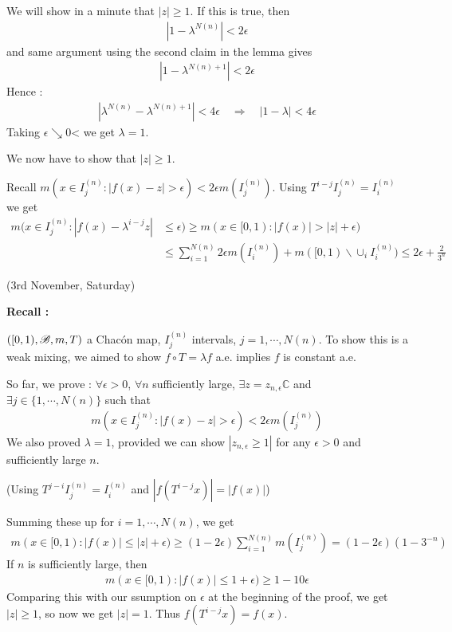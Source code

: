 \documentclass[12pt,a4paper]{report}
\newenvironment{proof}
{\begin{changemargin}{1cm}{0.5cm} 
	}%
	{\end{changemargin}
}
\newenvironment{subproof}
{\begin{changemargin}{0.5cm}{0.5cm}
	}%
	{\end{changemargin}
}
\begin{document}
\begin{proof}
\quad We will show in a minute that $|z| \geq 1$. If this is true, then
\begin{align*}
|1-\lambda^{N(n)}| < 2\epsilon
\end{align*} 
and same argument using the second claim in the lemma gives
\begin{align*}
|1- \lambda^{N(n)+1}| < 2\epsilon
\end{align*}
Hence :
\begin{align*}
|\lambda^{N(n)} - \lambda^{N(n)+1}| < 4\epsilon \quad \Rightarrow \quad |1-\lambda| < 4\epsilon
\end{align*}
Taking $\epsilon \searrow 0$< we get $\lambda =1$.

We now have to show that $|z| \geq 1$.
\begin{subproof}
 Recall $m(x\in I^{(n)}_j : |f(x)-z| > \epsilon) < 2\epsilon m(I^{(n)}_j)$. Using $T^{i-j}I_j^{(n)} = I^{(n)}_i$ we get
\begin{align*}
m(x\in I^{(n)}_j : |f(x) - \lambda^{i-j} z| &\leq \epsilon) \geq m(x\in [0,1) : |f(x)| > |z|+ \epsilon) \\
&\leq \sum_{i=1}^{N(n)} 2\epsilon m(I^{(n)}_i) + m([0,1) \backslash \cup_i I_i^{(n)}) \leq 2\epsilon + \frac{2}{3^n}
\end{align*}
\end{subproof}
\end{proof}
\s

\newday

(3rd November, Saturday)
\s

\textbf{Recall :}

$([0,1),\mathscr{B},m,T)$ a Chac\'{o}n map, $I_j^{(n)}$ intervals, $j=1,\cdots, N(n)$. To show this is a weak mixing, we aimed to show $f\circ T = \lambda f$ a.e. implies $f$ is constant a.e.
\s

So far, we prove : $\forall \epsilon >0$, $\forall n$ sufficiently large, $\exists z = z_{n,\epsilon} \mathbb{C}$ and $\exists j \in \{1, \cdots, N(n)\}$ such that
\begin{align*}
m(x\in I_j^{(n)}: |f(x) -z| > \epsilon ) < 2\epsilon m(I_j^{(n)})
\end{align*}
We also proved $\lambda =1$, provided we can show $|z_{n,\epsilon} \geq 1|$ for any $\epsilon >0$ and sufficiently large $n$.

(Using $T^{j-i}I_j^{(n)} = I_i^{(n)}$ and $|f(T^{i-j}x)| = |f(x)|$)
\s

\quad Summing these up for $i=1,\cdots, N(n)$, we get
\begin{align*}
m(x\in [0,1) : |f(x)| \leq |z| +\epsilon) \geq (1-2\epsilon) \sum_{i=1}^{N(n)} m(I^{(n)}_j) = (1-2\epsilon) (1-3^{-n})
\end{align*}
If $n$ is sufficiently large, then
\begin{align*}
m(x\in[0,1) : |f(x)| \leq 1+ \epsilon) \geq 1-10\epsilon
\end{align*}
Comparing this with our ssumption on $\epsilon$ at the beginning of the proof, we get $|z| \geq 1$, so now we get $|z| =1$. Thus $f(T^{i-j}x) = f(x)$.
\end{document}
